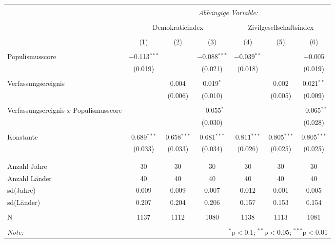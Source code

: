 \begin{table}[!htbp] \centering 
  \caption{} 
  \label{} 
\begin{tabular}{@{\extracolsep{5pt}}lcccccc} 
\\[-1.8ex]\hline 
\hline \\[-1.8ex] 
 & \multicolumn{6}{c}{\textit{Abhängige Variable:}} \\ 
\cline{2-7} 
\\[-1.8ex] & \multicolumn{3}{c}{Demokratieindex} & \multicolumn{3}{c}{Zivilgesellschaftsindex} \\ 
\\[-1.8ex] & (1) & (2) & (3) & (4) & (5) & (6)\\ 
\hline \\[-1.8ex] 
 Populismusscore & $-$0.113$^{***}$ &  & $-$0.088$^{***}$ & $-$0.039$^{**}$ &  & $-$0.005 \\ 
  & (0.019) &  & (0.021) & (0.018) &  & (0.019) \\ 
  & & & & & & \\ 
 Verfassungsereignis &  & 0.004 & 0.019$^{*}$ &  & 0.002 & 0.021$^{**}$ \\ 
  &  & (0.006) & (0.010) &  & (0.005) & (0.009) \\ 
  & & & & & & \\ 
  Verfassungsereignis $x$ Populismusscore &  &  & $-$0.055$^{*}$ &  &  & $-$0.065$^{**}$ \\ 
  &  &  & (0.030) &  &  & (0.028) \\ 
  & & & & & & \\ 
 Konstante & 0.689$^{***}$ & 0.658$^{***}$ & 0.681$^{***}$ & 0.811$^{***}$ & 0.805$^{***}$ & 0.805$^{***}$ \\ 
  & (0.033) & (0.033) & (0.034) & (0.026) & (0.025) & (0.025) \\ 
  & & & & & & \\ 
\hline \\[-1.8ex] 
Anzahl Jahre & 30 & 30 & 30 & 30 & 30 & 30 \\ 
Anzahl Länder & 40 & 40 & 40 & 40 & 40 & 40 \\ 
sd(Jahre) & 0.009 & 0.009 & 0.007 & 0.012 & 0.001 & 0.005 \\ 
sd(Länder) & 0.207 & 0.204 & 0.206 & 0.157 & 0.153 & 0.154 \\ 
 &  &  &  &  &  &  \\ 
N & 1137 & 1112 & 1080 & 1138 & 1113 & 1081 \\ 
\hline 
\hline \\[-1.8ex] 
\textit{Note:}  & \multicolumn{6}{r}{$^{*}$p$<$0.1; $^{**}$p$<$0.05; $^{***}$p$<$0.01} \\ 
\end{tabular} 
\end{table} 